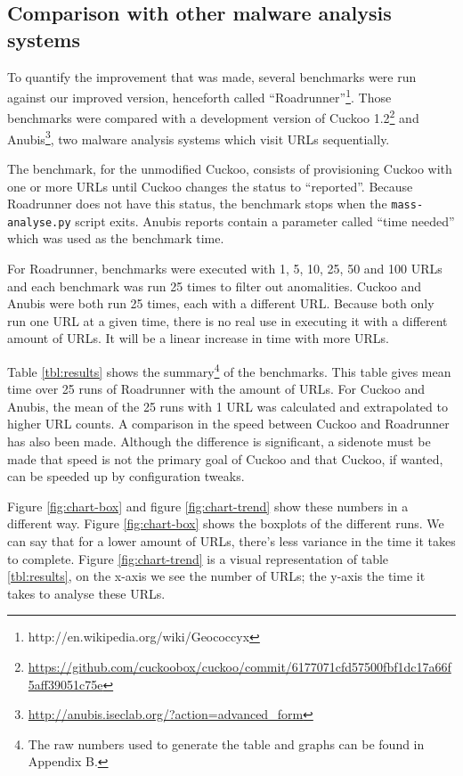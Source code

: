 \pagebreak

\restoregeometry
{}
\setcounter{page}{\thesavepage}

\subsection{Comparison with other malware analysis systems}

To quantify the improvement that was made, several benchmarks were run against our improved version, henceforth called ``Roadrunner''\footnote{http://en.wikipedia.org/wiki/Geococcyx}. Those benchmarks were compared with a development version of Cuckoo 1.2\footnote{\url{https://github.com/cuckoobox/cuckoo/commit/6177071cfd57500fbf1dc17a66f5aff39051c75e}} and Anubis\footnote{\url{http://anubis.iseclab.org/?action=advanced\_form}}, two malware analysis systems which visit URLs sequentially.%

The benchmark, for the unmodified Cuckoo, consists of provisioning Cuckoo with one or more URLs until Cuckoo changes the status to ``reported''. Because Roadrunner does not have this status, the benchmark stops when the \texttt{mass-analyse.py} script exits. Anubis reports contain a parameter called ``time needed'' which was used as the benchmark time.

For Roadrunner, benchmarks were executed with 1, 5, 10, 25, 50 and 100 URLs and each benchmark was run 25 times to filter out anomalities. Cuckoo and Anubis were both run 25 times, each with a different URL. Because both only run one URL at a given time, there is no real use in executing it with a different amount of URLs. It will be a linear increase in time with more URLs.

Table \ref{tbl:results} shows the summary\footnote{The raw numbers used to generate the table and graphs can be found in Appendix B.} of the benchmarks. This table gives mean time over 25 runs of Roadrunner with the amount of URLs. For Cuckoo and Anubis, the mean of the 25 runs with 1 URL was calculated and extrapolated to higher URL counts. A comparison in the speed between Cuckoo and Roadrunner has also been made. Although the difference is significant, a sidenote must be made that speed is not the primary goal of Cuckoo and that Cuckoo, if wanted, can be speeded up by configuration tweaks.

Figure \ref{fig:chart-box} and figure \ref{fig:chart-trend} show these numbers in a different way. Figure \ref{fig:chart-box} shows the boxplots of the different runs. We can say that for a lower amount of URLs, there's less variance in the time it takes to complete. Figure \ref{fig:chart-trend} is a visual representation of table \ref{tbl:results}, on the x-axis we see the number of URLs; the y-axis the time it takes to analyse these URLs. 


